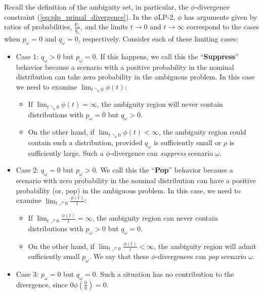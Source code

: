 \documentclass[ijoc,letterpaper]{informs3} %
\newcommand{\plp}{$\phi$LP-2}
\begin{document}
Recall the definition of the ambiguity set, in particular, the $\phi$-divergence constraint (\ref{eq:plp_primal_divergence}). 
In the \plp, $\phi$ has arguments given by ratios of probabilities, $\tfrac{p_\omega}{q_\omega}$, and the limits $t \rightarrow 0$ and $t \rightarrow \infty$ correspond to the cases when $p_\omega = 0$ and $q_\omega = 0$, respectively.
Consider each of these limiting cases:
\begin{itemize}
	\item {\sc Case 1:} $q_\omega > 0$ but $p_\omega = 0$. 
If this happens, we call this the ``{\bf Suppress}'' behavior because a scenario with a positive probability in the nominal distribution can take zero probability in the ambiguous problem. In this case we need to examine $\lim_{t \searrow 0} \phi(t)$:
	\begin{itemize}
		\item If $\lim_{t \searrow 0} \phi(t) = \infty$, the ambiguity region will never contain distributions with $p_\omega = 0$ but $q_\omega > 0$.
		\item On the other hand, if $\lim_{t \searrow 0} \phi(t) < \infty$, the ambiguity region could contain such a distribution, provided $q_\omega$ is sufficiently small or $\rho$ is sufficiently large.
			Such a $\phi$-divergence can \emph{suppress} scenario $\omega$.
	\end{itemize}
	\item {\sc Case 2:} $q_\omega = 0$ but $p_\omega > 0$. We call this the ``{\bf Pop}'' behavior because a scenario with zero probability in the nominal distribution can have a positive probability (or, pop) in the ambiguous problem. In this case, we need to examine $\lim_{t \nearrow 0} \frac{\phi(t)}{t}$:
	\begin{itemize}
		\item If $\lim_{t \nearrow 0} \frac{\phi(t)}{t} = \infty$, the ambiguity region can never contain distributions with $p_\omega > 0$ but $q_\omega = 0$.
		\item On the other hand, if $\lim_{t \nearrow 0} \frac{\phi(t)}{t} < \infty$, the ambiguity region will admit sufficiently small $p_\omega$.
			We say that these $\phi$-divergences can \emph{pop} scenario $\omega$.
	\end{itemize}
	\item {\sc Case 3:} $p_\omega = 0$ but $q_\omega = 0$. Such a situation has no contribution to the divergence, since $0 \phi\left(\tfrac{0}{0}\right) = 0$.
\end{itemize}
\end{document}
